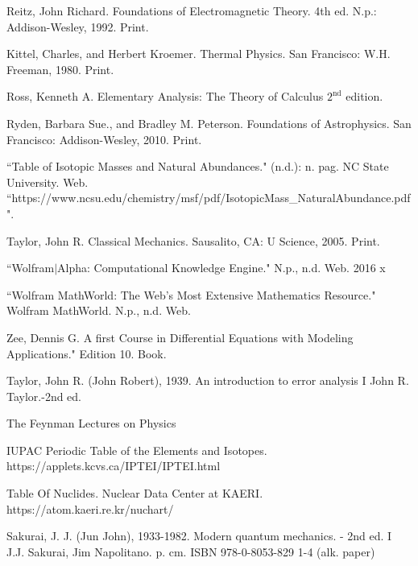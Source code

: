 {\begin{thebibliography}{99}
	
	 Reitz, John Richard. Foundations of Electromagnetic Theory. 4th ed. N.p.: Addison-Wesley, 1992. Print. 
	
	  Kittel, Charles, and Herbert Kroemer. Thermal Physics. San Francisco: W.H. Freeman, 1980. Print.
	
	
	 Ross, Kenneth A. Elementary Analysis: The Theory of Calculus $2^{\textrm{nd}}$ edition. 
	
	 Ryden, Barbara Sue., and Bradley M. Peterson. Foundations of Astrophysics. San Francisco: Addison-Wesley, 2010. Print. 
	
	 ``Table of Isotopic Masses and Natural Abundances." (n.d.): n. pag. NC State University. Web. ``https://www.ncsu.edu/chemistry/msf/pdf/IsotopicMass\_NaturalAbundance.pdf". 
	
	 Taylor, John R. Classical Mechanics. Sausalito, CA: U Science, 2005. Print. 
	
	 ``Wolfram$|$Alpha: Computational Knowledge Engine." N.p., n.d. Web. 2016 x
	
	 ``Wolfram MathWorld: The Web's Most Extensive Mathematics Resource." Wolfram MathWorld. N.p., n.d. Web. 
	
	 Zee, Dennis G. A first Course in Differential Equations with Modeling Applications." Edition 10. Book.
	
	 Taylor, John R. (John Robert), 1939. An introduction to error analysis I John R. Taylor.-2nd ed.
	
	 The Feynman Lectures on Physics

 	 IUPAC Periodic Table of the Elements and Isotopes. https://applets.kcvs.ca/IPTEI/IPTEI.html

  	 Table Of Nuclides.  Nuclear Data Center at KAERI. https://atom.kaeri.re.kr/nuchart/

   	 Sakurai, J. J. (Jun John), 1933-1982. Modern quantum mechanics. - 2nd ed. I J.J. Sakurai, Jim Napolitano. p. cm. ISBN 978-0-8053-829 1-4 (alk. paper)
\end{thebibliography}
}
